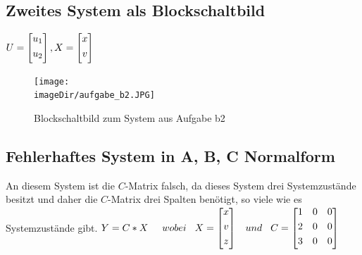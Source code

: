 \documentclass[11pt, a4paper, twoside]{article}   	%
\newcommand{\imageDir}{./images/}
\begin{document}
\subsection{Zweites System als Blockschaltbild}
$
U= \begin{bmatrix}
	u_1 \\[0.3em]
	u_2 \\[0.3em]
\end{bmatrix}
,
X = \begin{bmatrix}
	x \\[0.3em]
	v \\[0.3em]
\end{bmatrix}
\newline
\newline
\newline
$
\begin{figure}[h]
\centering
\texttt{[image: \\imageDir/aufgabe\_b2.JPG]}
\caption{Blockschaltbild zum System aus Aufgabe b2}
\label{fig:exercise-b1}
\end{figure}
\newpage

\subsection{Fehlerhaftes System in A, B, C Normalform}
An diesem System ist die $C$-Matrix falsch, da dieses System drei Systemzustände besitzt und daher die $C$-Matrix drei Spalten benötigt, so viele wie es Systemzustände gibt.
\newline
\newline
$
Y=C*X \hspace{5mm} wobei \hspace{3mm} 
X= \begin{bmatrix}
	x \\[0.3em]
	v \\[0.3em]
	z \\[0.3em]
\end{bmatrix}
\hspace{3mm} und \hspace{3mm} 
C = \begin{bmatrix}
	1 & 0 & 0 \\[0.3em]
	2 & 0 & 0 \\[0.3em]
	3 & 0 & 0 \\[0.3em]
\end{bmatrix}
$
\end{document}
